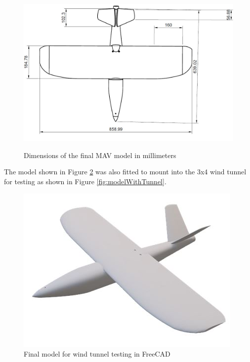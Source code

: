 \begin{figure}
    \centering
    \includegraphics{04_Methodology/Figs/dimensions.JPG}
    \label{fig:dimension}
    \caption{Dimensions of the final MAV model in millimeters}
\end{figure}

The model shown in Figure \ref{fig:freeCADModel} was also fitted to mount into the 3x4 wind tunnel for testing as shown in Figure \ref{fig:modelWithTunnel}.

\begin{figure}[H]
\centering
\includegraphics[]{04_Methodology/Figs/model2.jpg}
\caption{Final model for wind tunnel testing in FreeCAD}
\label{fig:freeCADModel}
\end{figure}


